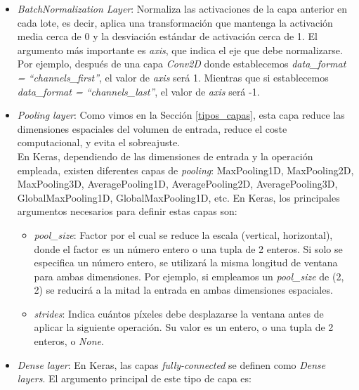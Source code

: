 \begin{itemize}
\begin{itemize}
        \end{itemize}
    
    \item \textit{BatchNormalization Layer}: Normaliza las activaciones de la capa anterior en cada lote, es decir, aplica una transformación que mantenga la activación media cerca de 0 y la desviación estándar de activación cerca de 1. El argumento más importante es \textit{axis}, que indica el eje que debe normalizarse. Por ejemplo, después de una capa \textit{Conv2D} donde establecemos \textit{data\_format = ``channels\_first''}, el valor de \textit{axis} será 1. Mientras que si establecemos \textit{data\_format = ``channels\_last''}, el valor de \textit{axis} será -1.
    
    \item \textit{Pooling layer}: Como vimos en la Sección \ref{tipos_capas}, esta capa reduce las dimensiones espaciales del volumen de entrada, reduce el coste computacional, y evita el sobreajuste.\\
    
    En Keras, dependiendo de las dimensiones de entrada y la operación empleada, existen diferentes capas de \textit{pooling}: MaxPooling1D, MaxPooling2D, MaxPooling3D, AveragePooling1D, AveragePooling2D, AveragePooling3D, GlobalMaxPooling1D, GlobalMaxPooling1D, etc. En Keras, los principales argumentos necesarios para definir estas capas son:
    
    \begin{itemize}
        \item \textit{pool\_size}: Factor por el cual se reduce la escala (vertical, horizontal), donde el factor es un número entero o una tupla de 2 enteros. Si solo se especifica un número entero, se utilizará la misma longitud de ventana para ambas dimensiones. Por ejemplo, si empleamos un \textit{pool\_size} de (2, 2) se reducirá a la mitad la entrada en ambas dimensiones espaciales.
        
        \item \textit{strides}: Indica cuántos píxeles debe desplazarse la ventana antes de aplicar la siguiente operación. Su valor es un entero, o una tupla de 2 enteros, o \textit{None}.

    \end{itemize}
    
    \item \textit{Dense layer}: En Keras, las capas \textit{fully-connected} se definen como \textit{Dense layers}. El argumento principal de este tipo de capa es:
    

\end{itemize}
